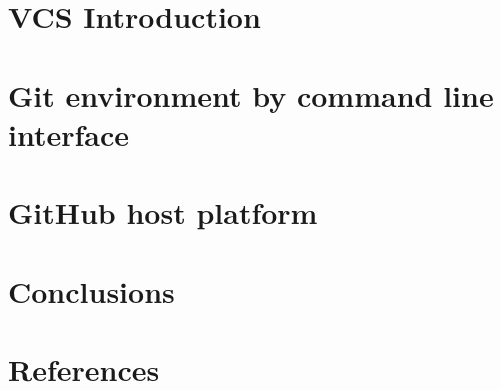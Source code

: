 \documentclass{beamer}
\begin{document}
\section{VCS Introduction}


\section{Git environment by command line interface}


\section{GitHub host platform}


%

\section{Conclusions}


\section{References}

\end{document}
